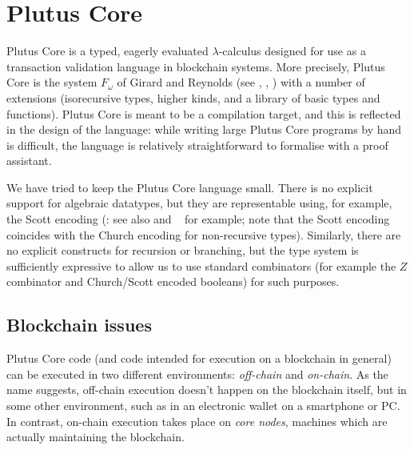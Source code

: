 \documentclass[a4paper]{article}
\begin{document}
%


\maketitle

\thispagestyle{plain}
\pagestyle{plain}



\section{Plutus Core}

Plutus Core is a typed, eagerly evaluated $\lambda$-calculus designed
for use as a transaction validation language in blockchain
systems. More precisely, Plutus Core is the system $F_\omega$ of
Girard and Reynolds (see \citep{Girard-thesis},
\citep{Reynolds-type-structure}, \citep[\S30]{Pierce:TAPL}) with a
number of extensions (isorecursive types, higher kinds, and a library
of basic types and functions).  Plutus Core is meant to be a
compilation target, and this is reflected in the design of the
language: while writing large Plutus Core programs by hand is
difficult, the language is relatively straightforward to formalise
with a proof assistant.

We have tried to keep the Plutus Core language small. There is no
explicit support for algebraic datatypes, but they are representable
using, for example, the Scott encoding (\citep{Scott-encoding}: see
also \citep{Koopman:2014} and ~\citep{Geuvers-2014} for example; note that
the Scott encoding coincides with the Church encoding for
non-recursive types). Similarly, there are no explicit constructs for
recursion or branching, but the type system is sufficiently expressive
to allow us to use standard combinators (for example the $Z$
combinator and Church/Scott encoded booleans) for such purposes.


\subsection{Blockchain issues}
Plutus Core code (and code intended for execution on a blockchain in
general) can be executed in two different environments:
\textit{off-chain} and \textit{on-chain}.  As the name suggests,
off-chain execution doesn't happen on the blockchain itself, but in
some other environment, such as in an electronic wallet on a
smartphone or PC.  In contrast, on-chain execution takes place on
\textit{core nodes}, machines which are actually maintaining the
blockchain.
\end{document}

